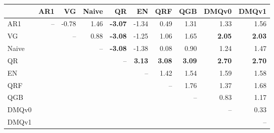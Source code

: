 \begin{tabular}{lrrrrrrrrr}
\toprule
 & AR1 & VG & Naive & QR & EN & QRF & QGB & DMQv0 & DMQv1 \\
\midrule
AR1 & -- & -0.78 & 1.46 & \textbf{-3.07} & -1.34 & 0.49 & 1.31 & 1.33 & 1.56 \\
VG &  & -- & 0.88 & \textbf{-3.08} & -1.25 & 1.06 & 1.65 & \textbf{2.05} & \textbf{2.03} \\
Naive &  &  & -- & \textbf{-3.08} & -1.38 & 0.08 & 0.90 & 1.24 & 1.47 \\
QR &  &  &  & -- & \textbf{3.13} & \textbf{3.08} & \textbf{3.09} & \textbf{2.70} & \textbf{2.70} \\
EN &  &  &  &  & -- & 1.42 & 1.54 & 1.59 & 1.58 \\
QRF &  &  &  &  &  & -- & 1.76 & 1.37 & 1.68 \\
QGB &  &  &  &  &  &  & -- & 0.83 & 1.17 \\
DMQv0 &  &  &  &  &  &  &  & -- & 0.33 \\
DMQv1 &  &  &  &  &  &  &  &  & -- \\
\bottomrule
\end{tabular}
